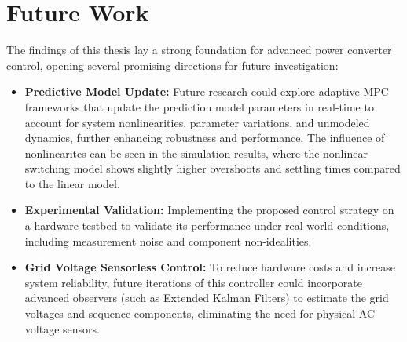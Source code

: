 \section{Future Work}
The findings of this thesis lay a strong foundation for advanced power converter control, opening several
promising directions for future investigation:
\begin{itemize}
    \item \textbf{Predictive Model Update:} Future research could explore adaptive MPC frameworks that update
    the prediction model parameters in real-time to account for system nonlinearities, parameter variations,
    and unmodeled dynamics, further enhancing robustness and performance. The influence of nonlinearites can be 
    seen in the simulation results, where the nonlinear switching model shows slightly higher overshoots and 
    settling times compared to the linear model.
    \item \textbf{Experimental Validation:} Implementing the proposed control strategy on a hardware testbed 
    to validate its performance under real-world conditions, including measurement noise and component non-idealities.
    \item \textbf{Grid Voltage Sensorless Control:} To reduce hardware costs and increase system reliability,
    future iterations of this controller could incorporate advanced observers (such as Extended Kalman Filters) to
    estimate the grid voltages and sequence components, eliminating the need for physical AC voltage sensors.

\end{itemize}
